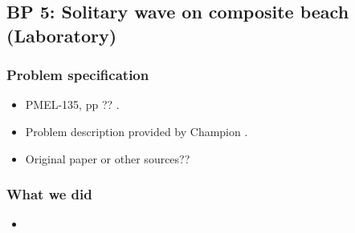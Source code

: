 \newsection

\subsection{BP 5:
 Solitary wave on composite beach (Laboratory) }



\subsubsection{Problem specification}

\begin{itemize}

\item PMEL-135, pp ??
\cite{SynolakisBernard:pmel135}.

\item Problem description provided by Champion 
      \cite{bp-description}.  

\item Original paper or other sources??

\end{itemize} 


\subsubsection{What we did}


\begin{itemize}
\item  
\end{itemize} 

